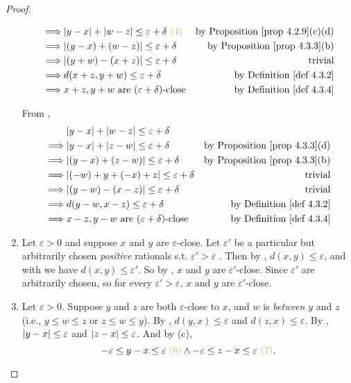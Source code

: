 \begin{proof}
\begin{enumerate}
\begin{align*}
            \implies & \abs{y - x} + \abs{w - z} \le \varepsilon + \delta \GREEN{\ (4)}  & \text{by \PROP{4.2.9}(c)(d)} \\
            \implies & \abs{(y - x) + (w - z)} \le \varepsilon + \delta & \text{by \PROP{4.3.3}(b)} \\
            \implies & \abs{(y + w) - (x + z)} \le \varepsilon + \delta & \text{trivial} \\
            \implies & d(x + z, y + w) \le \varepsilon + \delta & \text{by \DEF{4.3.2}} \\
            \implies & x + z, y + w \text{\ are \((\varepsilon + \delta)\)-close} & \text{by \DEF{4.3.4}}
        \end{align*}
    
        From ,
        \begin{align*}
                     & \abs{y - x} + \abs{w - z} \le \varepsilon + \delta \\
            \implies & \abs{y - x} + \abs{z - w} \le \varepsilon + \delta & \text{by \PROP{4.3.3}(d)} \\
            \implies & \abs{(y - x) + (z - w)} \le \varepsilon + \delta & \text{by \PROP{4.3.3}(b)} \\
            \implies & \abs{(-w) + y + (-x) + z} \le \varepsilon + \delta & \text{trivial} \\
            \implies & \abs{(y - w) - (x - z)} \le \varepsilon + \delta & \text{trivial} \\
            \implies & d(y - w, x - z) \le \varepsilon + \delta & \text{by \DEF{4.3.2}} \\
            \implies & x - z, y - w \text{\ are \((\varepsilon + \delta)\)-close} & \text{by \DEF{4.3.4}}
        \end{align*}
    \item
        Let \(\varepsilon > 0\) and suppose \(x\) and \(y\) are \(\varepsilon\)-close.
        Let \(\varepsilon'\) be a particular but arbitrarily chosen \emph{positive} rationals s.t. \(\varepsilon' > \varepsilon\) .
        Then by , \(d(x, y) \le \varepsilon\), and with  we have \(d(x, y) \le \varepsilon'\).
        So by , \(x\) and \(y\) are \(\varepsilon'\)-close.
        Since \(\varepsilon'\) are arbitrarily chosen, so for every \(\varepsilon' > \varepsilon\), \(x\) and \(y\) are \(\varepsilon'\)-close.
    \item
        Let \(\varepsilon > 0\).
        Suppose \(y\) and \(z\) are both \(\varepsilon\)-close to \(x\), and \(w\) is \emph{between} \(y\) and \(z\) (i.e., \(y \le w \le z\) or \(z \le w \le y\)).
        By , \(d(y, x) \le \varepsilon\) and \(d(z, x) \le \varepsilon\).
        By , \(\lvert y - x\rvert \le \varepsilon\) and \(\lvert z - x\rvert \le \varepsilon\).
        And by (c),
        \[
            -\varepsilon \le y - x \le \varepsilon \GREEN{\ (6)} \land -\varepsilon \le z - x \le \varepsilon \GREEN{\ (7)}.
        \]
        

\end{enumerate}
\end{proof}
